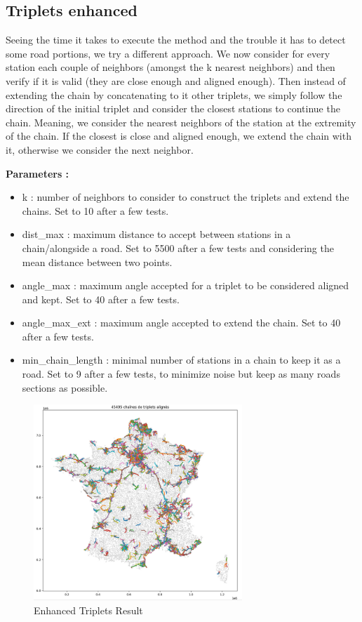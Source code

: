 \documentclass[main.tex]{subfiles}
\begin{document}
\subsection{Triplets enhanced}

Seeing the time it takes to execute the method and the trouble it has to detect some road portions, we try a different approach. We now consider for every station each couple of neighbors (amongst the k nearest neighbors) and then verify if it is valid (they are close enough and aligned enough). Then instead of extending the chain by concatenating to it other triplets, we simply follow the direction of the initial triplet and consider the closest stations to continue the chain. Meaning, we consider the nearest neighbors of the station at the extremity of the chain. If the closest is close and aligned enough, we extend the chain with it, otherwise we consider the next neighbor. 

\textbf{Parameters : }
\begin{itemize}
    \item k : number of neighbors to consider to construct the triplets and extend the chains. Set to 10 after a few tests.
    \item dist\_max : maximum distance to accept between stations in a chain/alongside a road. Set to 5500 after a few tests and considering the mean distance between two points.
    \item angle\_max : maximum angle accepted for a triplet to be considered aligned and kept. Set to 40 after a few tests.
    \item angle\_max\_ext : maximum angle accepted to extend the chain. Set to 40 after a few tests.
    \item min\_chain\_length : minimal number of stations in a chain to keep it as a road. Set to 9 after a few tests, to minimize noise but keep as many roads sections as possible. 
\end{itemize}

\begin{figure}[H]
    \centering
    \includegraphics[width=0.7\textwidth]{Images/Res_Triplets_enhanced.png}
    \caption{Enhanced Triplets Result}
\end{figure}
\end{document}
